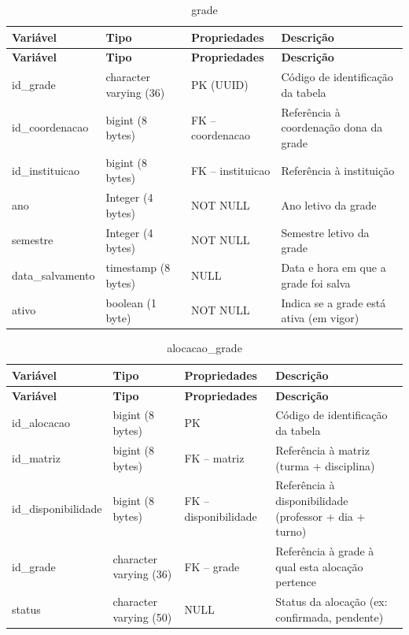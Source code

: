 \fonteautores

\vspace{\baselineskip}

\Needspace{0.32\textheight}
\begin{longtable}{|L{5.2cm}|L{3.2cm}|L{2.4cm}|L{3.4cm}|}
\caption{grade} \\
\hline
\textbf{Variável} & \textbf{Tipo} & \textbf{Propriedades} & \textbf{Descrição} \\
\hline
\endfirsthead
\hline
\textbf{Variável} & \textbf{Tipo} & \textbf{Propriedades} & \textbf{Descrição} \\
\hline
\endhead
id\_grade & character varying (36) & PK (UUID) & Código de identificação da tabela \\
\hline
id\_coordenacao & bigint (8 bytes) & FK – coordenacao & Referência à coordenação dona da grade \\
\hline
id\_instituicao & bigint (8 bytes) & FK – instituicao & Referência à instituição \\
\hline
ano & Integer (4 bytes) & NOT NULL & Ano letivo da grade \\
\hline
semestre & Integer (4 bytes) & NOT NULL & Semestre letivo da grade \\
\hline
data\_salvamento & timestamp (8 bytes) & NULL & Data e hora em que a grade foi salva \\
\hline
ativo & boolean (1 byte) & NOT NULL & Indica se a grade está ativa (em vigor) \\
\hline
\end{longtable}

\fonteautores

\vspace{\baselineskip}

\Needspace{0.32\textheight}
\begin{longtable}{|L{5.2cm}|L{3.2cm}|L{2.4cm}|L{3.4cm}|}
\caption{alocacao\_grade} \\
\hline
\textbf{Variável} & \textbf{Tipo} & \textbf{Propriedades} & \textbf{Descrição} \\
\hline
\endfirsthead
\hline
\textbf{Variável} & \textbf{Tipo} & \textbf{Propriedades} & \textbf{Descrição} \\
\hline
\endhead
id\_alocacao & bigint (8 bytes) & PK & Código de identificação da tabela \\
\hline
id\_matriz & bigint (8 bytes) & FK – matriz & Referência à matriz (turma + disciplina) \\
\hline
id\_disponibilidade & bigint (8 bytes) & FK – disponibilidade & Referência à disponibilidade (professor + dia + turno) \\
\hline
id\_grade & character varying (36) & FK – grade & Referência à grade à qual esta alocação pertence \\
\hline
status & character varying (50) & NULL & Status da alocação (ex: confirmada, pendente) \\
\hline
\end{longtable}

\fonteautores

\endgroup

